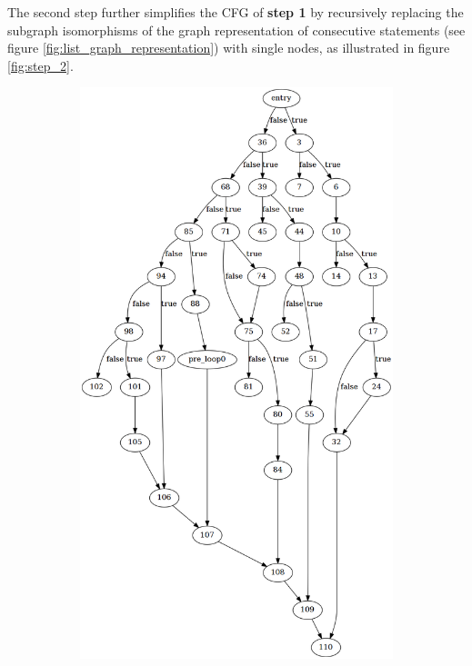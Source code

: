 The second step further simplifies the CFG of \textbf{step 1} by recursively replacing the subgraph isomorphisms of the graph representation of consecutive statements (see figure \ref{fig:list_graph_representation}) with single nodes, as illustrated in figure \ref{fig:step_2}.

\begin{figure}[htbp]
	\centering
	\begin{subfigure}[t]{0.45\textwidth}
		\includegraphics[width=\textwidth]{appendices/control_flow_analysis_example/stmt_1.png}

\end{subfigure}
\end{figure}

